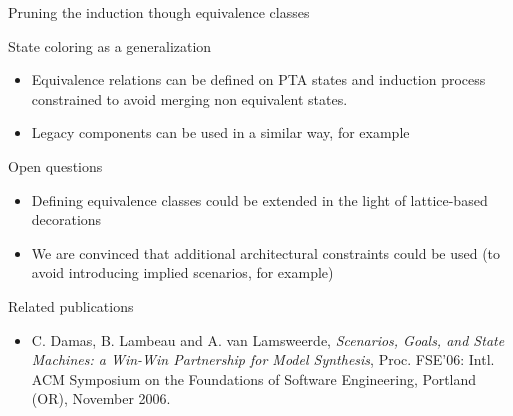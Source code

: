\documentclass[11pt]{beamer}
\begin{document}
\begin{frame}{Pruning the induction though equivalence classes}
	\begin{block}{State coloring as a generalization}
		\begin{itemize}
			\item Equivalence relations can be defined on PTA states and induction process constrained to avoid merging
				non equivalent states.
			\item Legacy components can be used in a similar way, for example
		\end{itemize}
	\end{block}
	\begin{block}{Open questions}
		\begin{itemize}
			\item Defining equivalence classes could be extended in the light of lattice-based decorations
			\item We are convinced that additional architectural constraints could be used (to avoid introducing implied scenarios, for example)
		\end{itemize}
	\end{block}
	\begin{block}{Related publications}
   		\scriptsize
		\begin{itemize}
			\item C. Damas, B. Lambeau and A. van Lamsweerde, \emph{Scenarios, Goals, and State Machines: a Win-Win Partnership for Model Synthesis}, 
                                      Proc. FSE'06: Intl. ACM Symposium on the Foundations of Software Engineering, Portland (OR), November 2006. 
		\end{itemize}
	   \end{block}
\end{frame}
\end{document}
